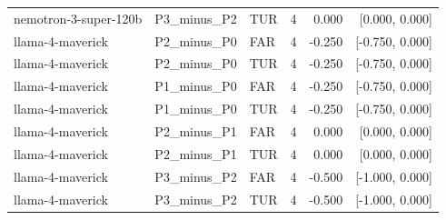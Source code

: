 \begin{tabular}{llllrr}
nemotron-3-super-120b & P3\_minus\_P2 & TUR & 4 & 0.000 & [0.000, 0.000] \\
llama-4-maverick & P2\_minus\_P0 & FAR & 4 & -0.250 & [-0.750, 0.000] \\
llama-4-maverick & P2\_minus\_P0 & TUR & 4 & -0.250 & [-0.750, 0.000] \\
llama-4-maverick & P1\_minus\_P0 & FAR & 4 & -0.250 & [-0.750, 0.000] \\
llama-4-maverick & P1\_minus\_P0 & TUR & 4 & -0.250 & [-0.750, 0.000] \\
llama-4-maverick & P2\_minus\_P1 & FAR & 4 & 0.000 & [0.000, 0.000] \\
llama-4-maverick & P2\_minus\_P1 & TUR & 4 & 0.000 & [0.000, 0.000] \\
llama-4-maverick & P3\_minus\_P2 & FAR & 4 & -0.500 & [-1.000, 0.000] \\
llama-4-maverick & P3\_minus\_P2 & TUR & 4 & -0.500 & [-1.000, 0.000] \\
\bottomrule
\end{tabular}
